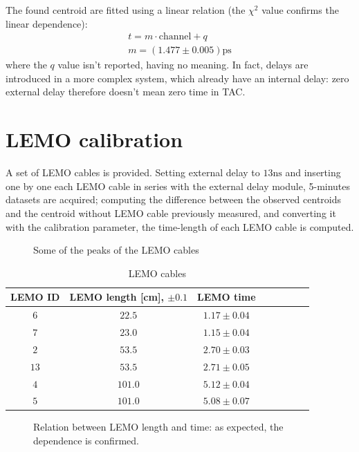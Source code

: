 \documentclass[11pt,a4 paper]{article}
\begin{document}
The found centroid are fitted using a linear relation (the $\chi^2$ value confirms the linear dependence):
\begin{gather*}
    t = m\cdot \text{channel} + q \\
    m = ( 1.477 \pm 0.005) \si{\pico\second}
\end{gather*}
where the $q$ value isn't reported, having no meaning. In fact, delays are introduced in a more complex system, which already have an internal delay: zero external delay therefore doesn't mean zero time in TAC.

\section{LEMO calibration}
A set of LEMO cables is provided. Setting external delay to $13\si{\nano\second}$ and inserting one by one each LEMO cable in series with the external delay module, 5-minutes datasets are acquired; computing the difference between the observed centroids and the centroid without LEMO cable previously measured, and converting it with the calibration parameter, the time-length of each LEMO cable is computed.

\begin{figure}[H]
    \centering
    \caption{Some of the peaks of the LEMO cables}
    \label{fig:lemo}
\end{figure}

\begin{table}[H]
    \centering
    \begin{tabular}{cccccccc}
        \toprule
        LEMO ID & LEMO length [cm], $\pm 0.1$ & LEMO time \\
        \midrule
        $6$ & $22.5$ & $1.17\pm0.04$\\
        $7$ & $23.0$ & $1.15\pm0.04$\\
        $2$ & $53.5$ & $2.70\pm0.03$\\
        $13$ & $53.5$ & $2.71\pm0.05$\\
        $4$ & $101.0$ & $5.12\pm0.04$\\
        $5$ & $101.0$ & $5.08\pm0.07$\\
        \bottomrule
    \end{tabular}
    \caption{LEMO cables}
    \label{tab:lemo}
\end{table}

\begin{figure}[H]
    \centering
    \caption{Relation between LEMO length and time: as expected, the dependence is confirmed.}
    \label{fig:lemo_length}
\end{figure}
\end{document}
